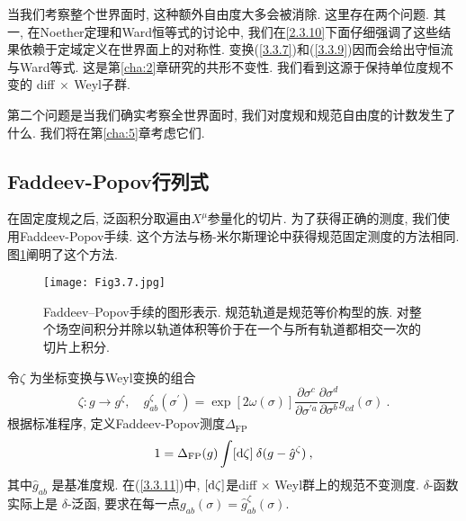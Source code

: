 当我们考察整个世界面时, 这种额外自由度大多会被消除. 这里存在两个问题. 其一, 在Noether定理和Ward恒等式的讨论中, 我们在\eqref{2.3.10}下面仔细强调了这些结果依赖于定域定义在世界面上的对称性. 变换(\ref{3.3.7})和(\ref{3.3.9})因而会给出守恒流与Ward等式. 这是第\ref{cha:2}章研究的共形不变性. 我们看到这源于保持单位度规不变的 diff$\:\times\:$Weyl子群.

第二个问题是当我们确实考察全世界面时, 我们对度规和规范自由度的计数发生了什么. 我们将在第\ref{cha:5}章考虑它们.

\subsection*{Faddeev-Popov行列式}

在固定度规之后, 泛函积分取遍由$X^\mu$参量化的切片. 为了获得正确的测度, 我们使用Faddeev-Popov手续. 这个方法与杨-米尔斯理论中获得规范固定测度的方法相同. 图\ref{Fig:3.7}阐明了这个方法.
\begin{figure}
	\begin{center}
		\texttt{[image: Fig3.7.jpg]}\\
\caption{Faddeev–Popov手续的图形表示. 规范轨道是规范等价构型的族. 对整个场空间积分并除以轨道体积等价于在一个与所有轨道都相交一次的切片上积分.}\label{Fig:3.7}
	\end{center}
\end{figure}


令$\zeta$ 为坐标变换与Weyl变换的组合
\begin{equation}
\zeta: g \rightarrow g^{\zeta}, \quad g_{a b}^{\zeta}(\sigma^{\prime}) = 
\exp [2 \omega(\sigma)] \frac{\partial \sigma^{c}}{\partial \sigma^{\prime a}} \frac{\partial \sigma^{d}}{\partial \sigma^{b}} g_{c d}(\sigma) \:. \label{3.3.10}
\end{equation}
根据标准程序, 定义Faddeev-Popov测度$\Delta_{\mathrm{FP}}$
\begin{equation}\label{3.3.11}
1=\Delta_{\mathrm{FP}}(g) \int[\mathrm{d} \zeta] \: \delta(g-\hat{g}^{\zeta}) \:, 
\end{equation}
其中$\hat{g}_{a b}$ 是基准度规. 在(\ref{3.3.11})中, $[\mathrm{d} \zeta]$是diff $\times$ Weyl群上的规范不变测度. $\delta$-函数实际上是 $\delta$-泛函, 
要求在每一点$g_{a b}(\sigma)=\hat{g}_{a b}^{\zeta}(\sigma)$. 

